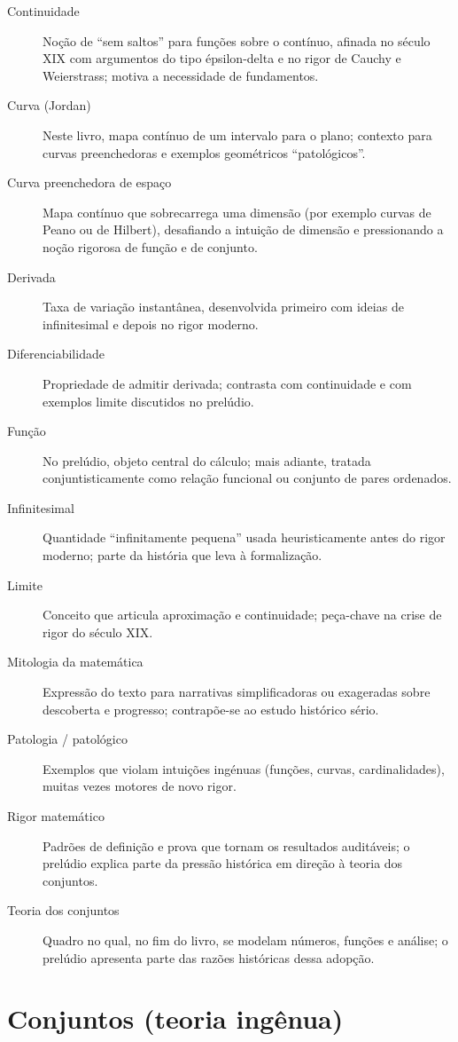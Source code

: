 \begin{description}
\item[Continuidade] Noção de ``sem saltos'' para funções sobre o contínuo, afinada no século XIX com argumentos do tipo épsilon-delta e no rigor de Cauchy e Weierstrass; motiva a necessidade de fundamentos.
\item[Curva (Jordan)] Neste livro, mapa contínuo de um intervalo para o plano; contexto para curvas preenchedoras e exemplos geométricos ``patológicos''.
\item[Curva preenchedora de espaço] Mapa contínuo que sobrecarrega uma dimensão (por exemplo curvas de Peano ou de Hilbert), desafiando a intuição de dimensão e pressionando a noção rigorosa de função e de conjunto.
\item[Derivada] Taxa de variação instantânea, desenvolvida primeiro com ideias de infinitesimal e depois no rigor moderno.
\item[Diferenciabilidade] Propriedade de admitir derivada; contrasta com continuidade e com exemplos limite discutidos no prelúdio.
\item[Função] No prelúdio, objeto central do cálculo; mais adiante, tratada conjuntisticamente como relação funcional ou conjunto de pares ordenados.
\item[Infinitesimal] Quantidade ``infinitamente pequena'' usada heuristicamente antes do rigor moderno; parte da história que leva à formalização.
\item[Limite] Conceito que articula aproximação e continuidade; peça-chave na crise de rigor do século XIX.
\item[Mitologia da matemática] Expressão do texto para narrativas simplificadoras ou exageradas sobre descoberta e progresso; contrapõe-se ao estudo histórico sério.
\item[Patologia / patológico] Exemplos que violam intuições ingénuas (funções, curvas, cardinalidades), muitas vezes motores de novo rigor.
\item[Rigor matemático] Padrões de definição e prova que tornam os resultados auditáveis; o prelúdio explica parte da pressão histórica em direção à teoria dos conjuntos.
\item[Teoria dos conjuntos] Quadro no qual, no fim do livro, se modelam números, funções e análise; o prelúdio apresenta parte das razões históricas dessa adopção.
\end{description}

\section*{Conjuntos (teoria ingênua)}

